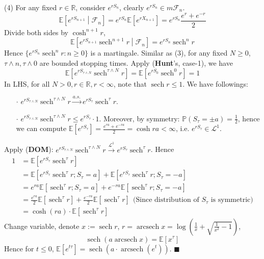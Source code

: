 \documentclass[a4paper,12pt,twoside]{book}
\DeclareMathOperator{\sech}{sech}
\DeclareMathOperator{\arcsech}{arcsech}
\begin{document}
\begin{itemize}
\begin{itemize}
	(4) For any fixed $r\in \mathbb{R}$, consider $e^{rS_n}$, clearly $e^{rS_n}\in m \mathcal{F}_n$.
	\begin{equation}
		\mathbb{E}\left[e^{rS_{n+1}}\middle|\mathcal{F}_n\right]=e^{rS_n} \mathbb{E}\left[e^{rX_{n+1}}\right]=e^{rS_n}\frac{e^r+e^{-r}}{2}
	\end{equation}
	Divide both sides by $\cosh^{n+1} r$,
	\begin{equation}
		\mathbb{E}\left[e^{rS_{n+1}}\sech^{n+1}r\middle|\mathcal{F}_n\right]=e^{rS_n}\sech^n r
	\end{equation}
	Hence $\{e^{rS_n}\sech^n r:n\geq 0\}$ is a martingale. Similar as (3), for any fixed $N\geq 0$, $\tau \wedge n, \tau \wedge 0$ are bounded stopping times. Apply (\textbf{Hunt}'s, case-1), we have
	\begin{equation}
		\mathbb{E}\left[e^{rS_{\tau \wedge N}}\sech^{\tau \wedge N} r\right]=\mathbb{E}\left[e^{rS_{0}}\sech^{0} r\right]=1
	\end{equation}
	In LHS, for all $N>0, r\in \mathbb{R}, r<\infty$, note that $\sech r\leq 1$. \newline
	We have followings:
	\begin{itemize}
		\item[$\cdot$] $e^{rS_{\tau \wedge N}}\sech^{\tau \wedge N} r \xrightarrow{a.s.} e^{rS_{\tau}}\sech^{\tau} r$.
		\item[$\cdot$] $e^{rS_{\tau \wedge N}}\sech^{\tau \wedge N} r\leq e^{rS_{\tau}}\cdot 1$. Moreover, by symmetry: $\mathbb{P}\left(S_{\tau}=\pm a\right)=\frac{1}{2}$, hence we can compute $\mathbb{E}\left[e^{rS_{\tau}}\right]=\frac{e^{ra}+e^{-ra}}{2}=\cosh ra < \infty$, i.e. $e^{rS_{\tau}} \in \mathcal{L}^1$.
	\end{itemize}
	Apply (\textbf{DOM}): $e^{rS_{\tau \wedge N}}\sech^{\tau \wedge N} r \xrightarrow{\mathcal{L}^1} e^{rS_{\tau}}\sech^{\tau} r$. Hence
	\begin{equation}
		\begin{split}
			1&=\mathbb{E}\left[e^{rS_{\tau}}\sech^{\tau} r\right]\\
			&=\mathbb{E}\left[e^{rS_{\tau}}\sech^{\tau} r; S_{\tau}=a\right]+\mathbb{E}\left[e^{rS_{\tau}}\sech^{\tau} r; S_{\tau}=-a\right]\\
			&=e^{ra}\mathbb{E}\left[\sech^{\tau} r; S_{\tau}=a\right]+e^{-ra}\mathbb{E}\left[\sech^{\tau} r; S_{\tau}=-a\right]\\
			&=\frac{e^{ra}}{2}\mathbb{E}\left[\sech^{\tau} r\right]+\frac{e^{-ra}}{2}\mathbb{E}\left[\sech^{\tau} r\right]~~\text{(Since distribution of $S_{\tau}$ is symmetric)}\\
			&= \cosh (ra) \cdot \mathbb{E}\left[\sech^{\tau}r\right]
		\end{split}
	\end{equation}
	Change variable, denote $x:=\sech r$, $r=\arcsech x=\log\left(\frac{1}{x}+\sqrt{\frac{1}{x^2}-1}\right)$,
	\begin{equation}
		\sech(a \arcsech x) = \mathbb{E}\left[x^{\tau}\right]
	\end{equation}
	Hence for $t\leq 0$, $\mathbb{E}\left[e^{t\tau}\right]=\sech(a\cdot \arcsech(e^t))$. $\blacksquare$
\end{itemize}


\end{itemize}
\end{document}
